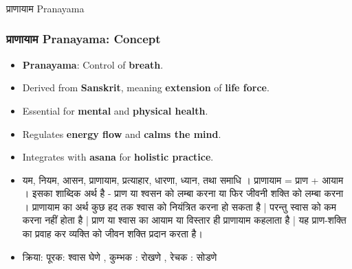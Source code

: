 \begin{frame}[fragile]\frametitle{}
\begin{center}
{\Large प्राणायाम Pranayama}
\end{center}
\end{frame}

\begin{frame}[fragile]\frametitle{प्राणायाम Pranayama: Concept}

      \begin{itemize}
        \item \textbf{Pranayama}: Control of \textbf{breath}.
        \item Derived from \textbf{Sanskrit}, meaning \textbf{extension} of \textbf{life force}.
        \item Essential for \textbf{mental} and \textbf{physical health}.
        \item Regulates \textbf{energy flow} and \textbf{calms the mind}.
        \item Integrates with \textbf{asana} for \textbf{holistic practice}.
		\item  यम, नियम, आसन, प्राणायाम, प्रत्याहार, धारणा, ध्यान, तथा समाधि । प्राणायाम = प्राण + आयाम । इसका शाब्दिक अर्थ है -  प्राण या श्वसन को लम्बा करना  या फिर   जीवनी शक्ति  को लम्बा करना । प्राणायाम का अर्थ कुछ हद तक श्वास को नियंत्रित करना हो सकता है | परन्तु स्वास को कम करना नहीं होता है | प्राण या श्वास का आयाम या विस्तार ही प्राणायाम कहलाता है | यह प्राण-शक्ति का प्रवाह कर व्यक्ति को जीवन शक्ति प्रदान करता है।
		\item क्रिया: पूरक: श्वास घेणे , कुम्भक : रोखणे , रेचक : सोडणे 

      \end{itemize}

\end{frame}


